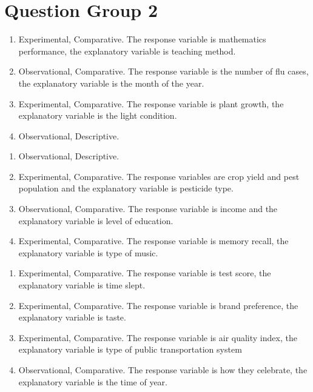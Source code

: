\documentclass{article}
\begin{document}
\section*{Question Group 2}
\begin{enumerate}
\item Experimental, Comparative. The response variable is mathematics performance, the explanatory variable is teaching method. \\
\item Observational, Comparative. The response variable is the number of flu cases, the explanatory variable is the month of the year. \\
\item Experimental, Comparative. The response variable is plant growth, the explanatory variable is the light condition. \\
\item Observational, Descriptive.
\end{enumerate}
\begin{enumerate}
\item Observational, Descriptive. \\
\item Experimental, Comparative. The response variables are crop yield and pest population and the explanatory variable is pesticide type. \\
\item Observational, Comparative. The response variable is income and the explanatory variable is level of education. \\
\item Experimental, Comparative. The response variable is memory recall, the explanatory variable is type of music.
\end{enumerate}
\begin{enumerate}
\item Experimental, Comparative. The response variable is test score, the explanatory variable is time slept. \\
\item Experimental, Comparative. The response variable is brand preference, the explanatory variable is taste. \\
\item Experimental, Comparative. The response variable is air quality index, the explanatory variable is type of public transportation system \\
\item Observational, Comparative. The response variable is how they celebrate, the explanatory variable is the time of year. \\
\end{enumerate}
\end{document}
